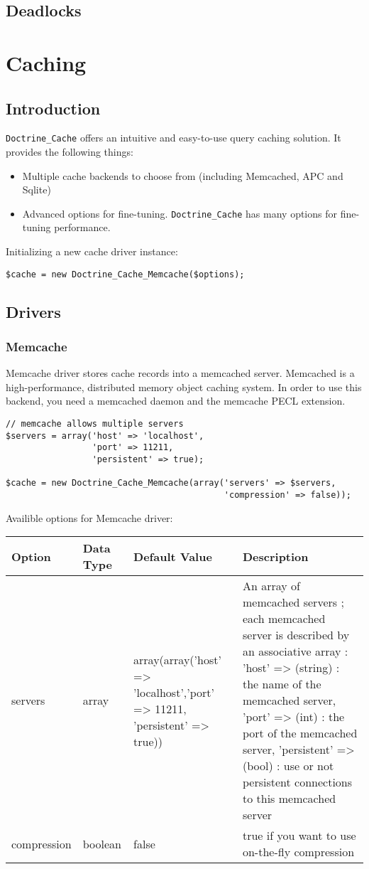 \documentclass[11pt,a4paper]{report}
\begin{document}
\section{Deadlocks}
\chapter{Caching}
\section{Introduction}
\texttt{Doctrine\_Cache} offers an intuitive and easy-to-use query caching solution. It provides the following things:

\begin{itemize}
\item{Multiple cache backends to choose from (including Memcached, APC and Sqlite)}
\item{Advanced options for fine-tuning. \texttt{Doctrine\_Cache} has many options for fine-tuning performance.}
\end{itemize}
Initializing a new cache driver instance:

\begin{verbatim}
$cache = new Doctrine_Cache_Memcache($options);
\end{verbatim}

\section{Drivers}
\subsection{Memcache}
Memcache driver stores cache records into a memcached server. Memcached is a high-performance, distributed memory object caching system. In order to use this backend, you need a memcached daemon and the memcache PECL extension.

\begin{verbatim}
// memcache allows multiple servers
$servers = array('host' => 'localhost',
                 'port' => 11211,
                 'persistent' => true);

$cache = new Doctrine_Cache_Memcache(array('servers' => $servers,
                                           'compression' => false));
\end{verbatim}

Availible options for Memcache driver:

\begin{tabular}{|l|l|l|l|}
\hline
Option & Data Type & Default Value & Description\\
\hline
servers & array & array(array('host' => 'localhost','port' => 11211, 'persistent' => true)) & An array of memcached servers ; each memcached server is described by an associative array : 'host' => (string) : the name of the memcached server, 'port' => (int) : the port of the memcached server, 'persistent' => (bool) : use or not persistent connections to this memcached server\\
\hline
compression & boolean & false & true if you want to use on-the-fly compression\\
\hline
\end{tabular}
\end{document}
